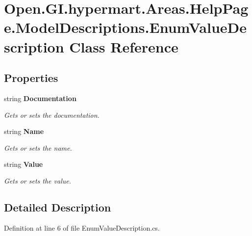 \section{Open.\+G\+I.\+hypermart.\+Areas.\+Help\+Page.\+Model\+Descriptions.\+Enum\+Value\+Description Class Reference}
\label{class_open_1_1_g_i_1_1hypermart_1_1_areas_1_1_help_page_1_1_model_descriptions_1_1_enum_value_description}


 


\subsection*{Properties}
\begin{DoxyCompactItemize}
\item 
string \textbf{ Documentation}\hspace{0.3cm}{\ttfamily  [get, set]}
\begin{DoxyCompactList}\small\item\em Gets or sets the documentation. \end{DoxyCompactList}\item 
string \textbf{ Name}\hspace{0.3cm}{\ttfamily  [get, set]}
\begin{DoxyCompactList}\small\item\em Gets or sets the name. \end{DoxyCompactList}\item 
string \textbf{ Value}\hspace{0.3cm}{\ttfamily  [get, set]}
\begin{DoxyCompactList}\small\item\em Gets or sets the value. \end{DoxyCompactList}\end{DoxyCompactItemize}


\subsection{Detailed Description}




Definition at line 6 of file Enum\+Value\+Description.\+cs.



